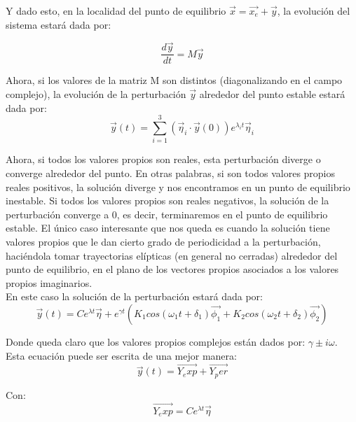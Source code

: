 \documentclass[%
 reprint,
 amsmath,amssymb,
 aps,
]{revtex4-1}
\begin{document}
Y dado esto, en la localidad del punto de equilibrio $\vec{x} = \vec{x_e} +\vec{y}$, la evolución del sistema estará dada por:

\begin{equation}
\frac{d\vec{y}}{dt} = M\vec{y}
\end{equation}

Ahora, si los valores de la matriz M son distintos (diagonalizando en el campo complejo), la evolución de la perturbación $\vec{y}$ alrededor del punto estable estará dada por:\\

\begin{equation}
\vec{y}(t) = \sum_{i=1}^{3} (\vec{\eta}_i\cdot\vec{y}(0))e^{\lambda_i t}\vec{\eta}_i
\end{equation}

Ahora, si todos los valores propios son reales, esta perturbación diverge o converge alrededor del punto. En otras palabras, si son todos valores propios reales positivos, la solución diverge y nos encontramos en un punto de equilibrio inestable. Si todos los valores propios son reales negativos, la solución de la perturbación converge a 0, es decir, terminaremos en el punto de equilibrio estable. El único caso interesante que nos queda es cuando la solución tiene valores propios que le dan cierto grado de periodicidad a la perturbación, haciéndola tomar trayectorias elípticas (en general no cerradas) alrededor del punto de equilibrio, en el plano de los vectores propios asociados a los valores propios imaginarios.\\


En este caso la solución de la perturbación estará dada por:\\

\begin{equation}
\vec{y}(t) = Ce^{\lambda t}\vec{\eta} + e^{\gamma t}(K_1cos(\omega_1t+\delta_1)\vec{\phi_1}+
 K_2cos(\omega_2t+\delta_2)\vec{\phi_2})
\end{equation}

Donde queda claro que los valores propios complejos están dados por: $\gamma \pm i\omega$. Esta ecuación puede ser escrita de una mejor manera:\\

\begin{equation}
\vec{y}(t) = \vec{Y_exp} + \vec{Y_per}
\end{equation}

Con:\\

\begin{equation}
\vec{Y_exp} = Ce^{\lambda t}\vec{\eta} 
\end{equation}
\end{document}
